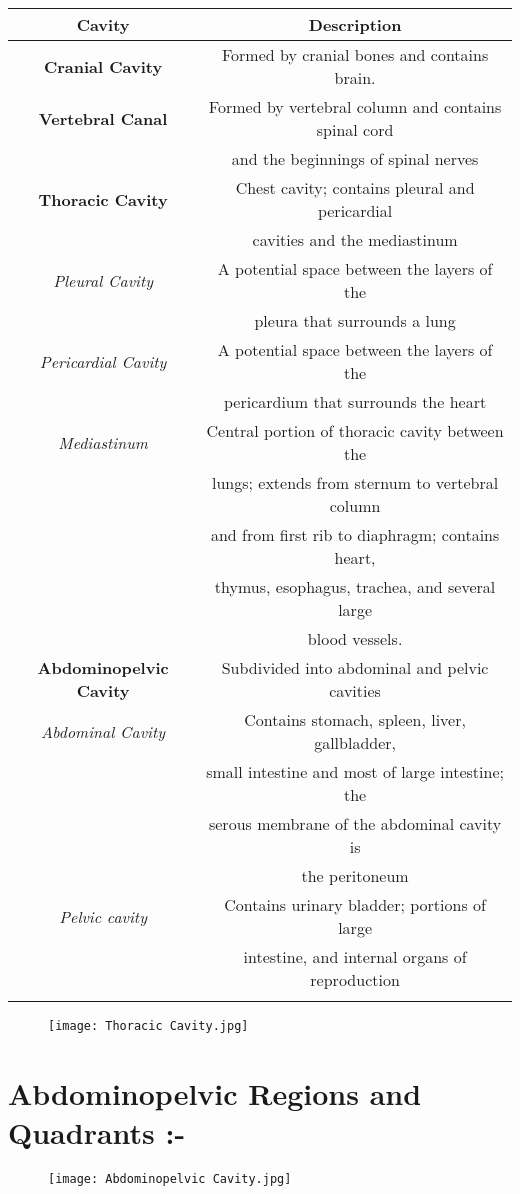 \documentclass[12pt]{article}
\begin{document}
\begin{small}
\raggedright
\raggedright
\begin{tabular}{|c|c|}
\hline
Cavity & Description \\
\hline
\textbf{Cranial Cavity} & Formed by cranial bones and contains brain. \\
\hline
\textbf{Vertebral Canal} & Formed by vertebral column and contains spinal cord\\
& and the beginnings of spinal nerves\\
\hline
\textbf{Thoracic Cavity} & Chest cavity; contains pleural and pericardial\\
& cavities and the mediastinum\\
\hline
\textit{Pleural Cavity} & A potential space between the layers of the\\
& pleura that surrounds a lung\\
\hline
\textit{Pericardial Cavity }& A potential space between the layers of the\\
& pericardium that surrounds the heart\\
\hline
\textit{Mediastinum} & Central portion of thoracic cavity between the\\
& lungs; extends from sternum to vertebral column\\ & and from first rib to diaphragm; contains heart,\\
& thymus, esophagus, trachea, and several large\\
& blood vessels.\\
\hline
\textbf{Abdominopelvic Cavity} & Subdivided into abdominal and pelvic cavities\\
\hline
\textit{Abdominal Cavity} & Contains stomach, spleen, liver, gallbladder,\\
& small intestine and most of large intestine; the\\
& serous membrane of the abdominal cavity is\\
& the peritoneum\\
\hline
\textit{Pelvic cavity} & Contains urinary bladder; portions of large\\
& intestine, and internal organs of reproduction\\
\hline
\raggedright
\end{tabular}

\begin{figure}[h]
\centering
\texttt{[image: Thoracic Cavity.jpg]}
\end{figure}

\section{Abdominopelvic Regions and Quadrants :- }
\begin{figure}[h]
\centering
\texttt{[image: Abdominopelvic Cavity.jpg]}
\end{figure}


\end{small}
\end{document}
